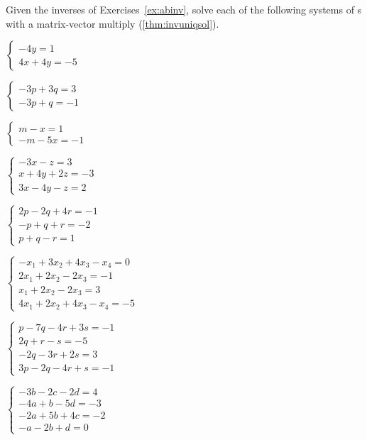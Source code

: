 \begin{exercise} \label{ex:} 
Given the inverses of Exercises~\ref{ex:abinv}, solve each of the following systems of s with a matrix-vector multiply (\autoref{thm:invuniqsol}).
\begin{parts}
\item \(\begin{cases} -4y=1\\4x+4y=-5 \end{cases}\)

\item \(\begin{cases} -3p+3q=3\\-3p+q=-1 \end{cases}\)

\item \(\begin{cases} m-x=1\\-m-5x=-1 \end{cases}\)

\item \(\begin{cases} -3x-z=3\\ x+4y+2z=-3\\ 3x-4y-z=2 \end{cases}\)

\item \(\begin{cases} 2p-2q+4r=-1\\ -p+q+r=-2\\ p+q-r=1 \end{cases}\)

\item \(\begin{cases} -x_1+3x_2+4x_3-x_4=0
\\2x_1+2x_2-2x_3=-1
\\x_1+2x_2-2x_3=3
\\4x_1+2x_2+4x_3-x_4=-5 \end{cases}\)

\item \(\begin{cases} p-7q-4r+3s=-1
\\2q+r-s=-5
\\-2q-3r+2s=3
\\3p-2q-4r+s=-1 \end{cases}\)

\item \(\begin{cases}-3b-2c-2d=4
\\-4a+b-5d=-3
\\-2a+5b+4c=-2
\\-a-2b+d=0 \end{cases}\)

\end{parts}
\end{exercise}




